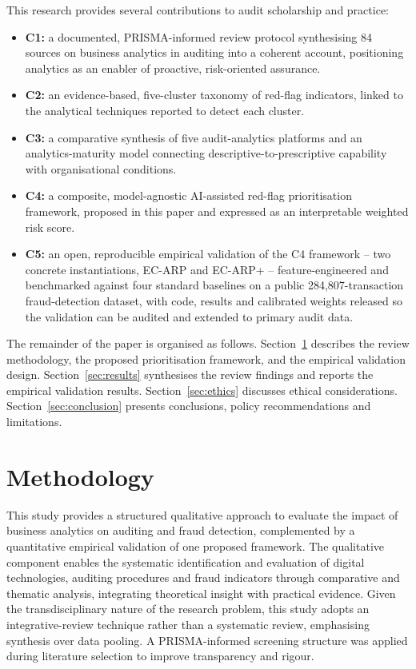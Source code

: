 \documentclass[preprint,12pt]{elsarticle}
\begin{document}
This research provides several contributions to audit scholarship and practice:
\begin{itemize}
    \item \textbf{C1:} a documented, PRISMA-informed review protocol synthesising 84 sources on business analytics in auditing into a coherent account, positioning analytics as an enabler of proactive, risk-oriented assurance.
    \item \textbf{C2:} an evidence-based, five-cluster taxonomy of red-flag indicators, linked to the analytical techniques reported to detect each cluster.
    \item \textbf{C3:} a comparative synthesis of five audit-analytics platforms and an analytics-maturity model connecting descriptive-to-prescriptive capability with organisational conditions.
    \item \textbf{C4:} a composite, model-agnostic AI-assisted red-flag prioritisation framework, proposed in this paper and expressed as an interpretable weighted risk score.
    \item \textbf{C5:} an open, reproducible empirical validation of the C4 framework -- two concrete instantiations, EC-ARP and EC-ARP+ -- feature-engineered and benchmarked against four standard baselines on a public 284,807-transaction fraud-detection dataset, with code, results and calibrated weights released so the validation can be audited and extended to primary audit data.
\end{itemize}

The remainder of the paper is organised as follows. Section~\ref{sec:method} describes the review methodology, the proposed prioritisation framework, and the empirical validation design. Section~\ref{sec:results} synthesises the review findings and reports the empirical validation results. Section~\ref{sec:ethics} discusses ethical considerations. Section~\ref{sec:conclusion} presents conclusions, policy recommendations and limitations.

\section{Methodology}
\label{sec:method}

This study provides a structured qualitative approach to evaluate the impact of business analytics on auditing and fraud detection, complemented by a quantitative empirical validation of one proposed framework. The qualitative component enables the systematic identification and evaluation of digital technologies, auditing procedures and fraud indicators through comparative and thematic analysis, integrating theoretical insight with practical evidence. Given the transdisciplinary nature of the research problem, this study adopts an integrative-review technique rather than a systematic review, emphasising synthesis over data pooling. A PRISMA-informed screening structure was applied during literature selection to improve transparency and rigour.
\end{document}
